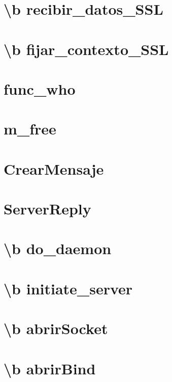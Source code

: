 \documentclass[twoside]{book}
\begin{document}
\chapter{\textbackslash{}b recibir\-\_\-datos\-\_\-\-S\-S\-L}
\label{recibir_datos_SSL}
\hypertarget{recibir_datos_SSL}{}

\chapter{\textbackslash{}b fijar\-\_\-contexto\-\_\-\-S\-S\-L}
\label{cerrar_canal_SSL}
\hypertarget{cerrar_canal_SSL}{}

\chapter{func\-\_\-who}
\label{func_who}
\hypertarget{func_who}{}

\chapter{m\-\_\-free}
\label{m_free}
\hypertarget{m_free}{}

\chapter{Crear\-Mensaje}
\label{CrearMensaje}
\hypertarget{CrearMensaje}{}

\chapter{Server\-Reply}
\label{ServerReply}
\hypertarget{ServerReply}{}

\chapter{\textbackslash{}b do\-\_\-daemon}
\label{do_daemon}
\hypertarget{do_daemon}{}

\chapter{\textbackslash{}b initiate\-\_\-server}
\label{initiate_server}
\hypertarget{initiate_server}{}

\chapter{\textbackslash{}b abrir\-Socket}
\label{abrirSocket}
\hypertarget{abrirSocket}{}

\chapter{\textbackslash{}b abrir\-Bind}
\label{abrirBind}
\hypertarget{abrirBind}{}

\end{document}
